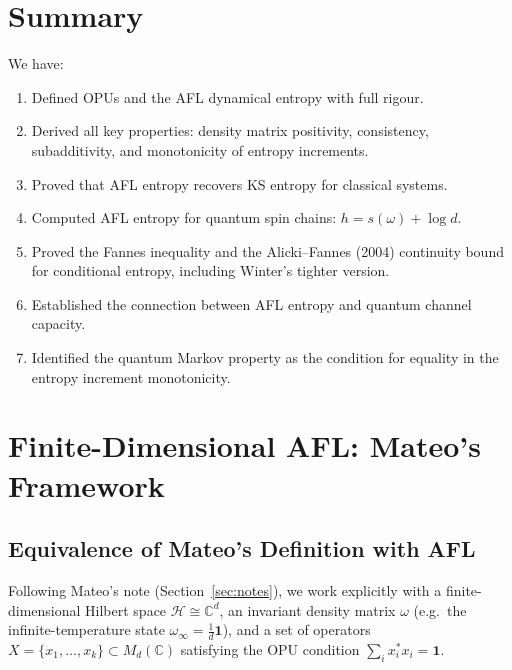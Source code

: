 \documentclass[12pt,a4paper]{article}
\newcommand{\HS}{\mathcal{H}}
\begin{document}
\section*{Summary}

We have:
\begin{enumerate}
  \item Defined OPUs and the AFL dynamical entropy with full rigour.
  \item Derived all key properties: density matrix positivity, consistency,
        subadditivity, and monotonicity of entropy increments.
  \item Proved that AFL entropy recovers KS entropy for classical systems.
  \item Computed AFL entropy for quantum spin chains: $h=s(\omega)+\log d$.
  \item Proved the Fannes inequality and the Alicki--Fannes (2004) continuity
        bound for conditional entropy, including Winter's tighter version.
  \item Established the connection between AFL entropy and quantum channel
        capacity.
  \item Identified the quantum Markov property as the condition for equality
        in the entropy increment monotonicity.
\end{enumerate}

\section{Finite-Dimensional AFL: Mateo's Framework}
\label{sec:mateo}

\subsection{Equivalence of Mateo's Definition with AFL}

Following Mateo's note (Section~\ref{sec:notes}), we work explicitly with
a finite-dimensional Hilbert space $\HS\cong\mathbb{C}^d$, an invariant
density matrix $\omega$ (e.g.\ the infinite-temperature state
$\omega_\infty=\frac{1}{d}\mathbf{1}$), and a set of operators
$X=\{x_1,\ldots,x_k\}\subset M_d(\mathbb{C})$ satisfying the OPU condition
$\sum_i x_i^* x_i = \mathbf{1}$.
\end{document}
